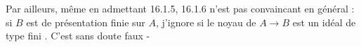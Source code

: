 
Par ailleurs, même en admettant 16.1.5, 16.1.6 n'est pas convaincant en général : si $B$ est de présentation finie sur $A$, j'ignore si le noyau de $A\longrightarrow B$ est un idéal de type fini . C'est sans doute faux -
